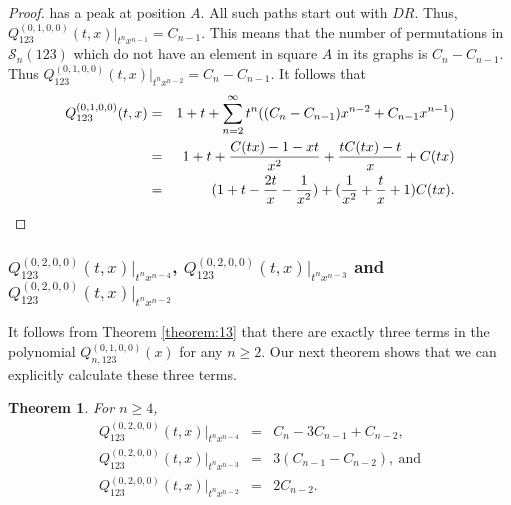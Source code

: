 \documentclass[
final,nomarks
]{dmtcs-episciences}
\newtheorem{theorem}{Theorem}
\newcommand{\tref}[1]{Theorem \ref{theorem:#1}}
\newcommand{\Sn}[1]{\mathcal{S}_{#1}}
\newcommand{\Qm}[1]{Q_{123}^{(#1)}(t,x)}
\newcommand{\Qmn}[2]{Q_{#2,123}^{(#1)}(x)}
\begin{document}
\begin{proof}
	has a peak at position \begin{math}A\end{math}. All such paths start out with \begin{math}DR\end{math}. Thus, \begin{math}\Qm{0,1,0,0}\big|_{t^n x^{n-1}}=C_{n-1}\end{math}. This means that the number of permutations in \begin{math}\Sn{n}(123)\end{math} which do not 
	have an element in square \begin{math}A\end{math} in its graphs is \begin{math}C_n-C_{n-1}\end{math}. Thus \begin{math}\Qm{0,1,0,0}\big|_{t^n x^{n-2}}=C_n-C_{n-1}\end{math}. It follows that 
	\begin{eqnarray}
		\Qm{0,1,0,0}&=&1+t+\sum_{n=2}^{\infty}t^n((C_n-C_{n-1})x^{n-2}+C_{n-1}x^{n-1})\nonumber\\\nonumber
		&=&1+t+\frac{C(tx)-1-xt}{x^2}+\frac{tC(tx)-t}{x}+C(tx)\\
		&=&(1+t-\frac{2t}{x}-\frac{1}{x^2})+(\frac{1}{x^2}+\frac{t}{x}+1)C(tx). \qedhere
	\end{eqnarray}
\end{proof}


\subsubsection{\(\Qm{0,2,0,0}\big|_{t^n x^{n-4}}\), \(\Qm{0,2,0,0}\big|_{t^n x^{n-3}}\) and \(\Qm{0,2,0,0}\big|_{t^n x^{n-2}}\)}

It follows from \tref{13} that there 
are exactly three terms in the polynomial \begin{math}\Qmn{0,1,0,0}{n}\end{math} for any \begin{math}n \geq 2\end{math}. 
Our next theorem shows that we can explicitly calculate these three terms.  

\begin{theorem}\label{theorem:15}
	For \begin{math}n\geq 4\end{math}, 
	\begin{eqnarray}
		\Qm{0,2,0,0}\big|_{t^n x^{n-4}}&=&C_n-3C_{n-1}+C_{n-2},\\
		\Qm{0,2,0,0}\big|_{t^n x^{n-3}}&=&3(C_{n-1}-C_{n-2}), \ \mbox{and} \\
		\Qm{0,2,0,0}\big|_{t^n x^{n-2}}&=&2C_{n-2}.
	\end{eqnarray}
\end{theorem}
\end{document}
